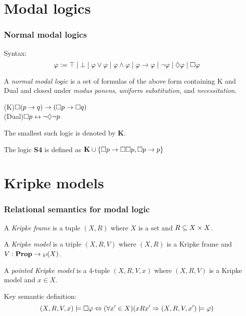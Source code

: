 \documentclass[
	11pt, %
	aspectratio=1610, %
]{beamer}
\begin{document}

\section{Modal logics}


\begin{frame}
	\frametitle{Normal modal logics}

		Syntax:
			\[ \varphi := \top
					\mid \bot
					\mid \varphi \lor \varphi
					\mid \varphi \land \varphi
					\mid \varphi \rightarrow \varphi
					\mid \neg \varphi
					\mid \Diamond \varphi
					\mid \Box \varphi \]

		\bigskip

		A \emph{normal modal logic} is a set of formulas of the above form containing K and Dual and closed under \emph{modus ponens}, \emph{uniform substitution}, and \emph{necessitation}.

		\bigskip

		(K)\hspace{1.08cm}$\Box (p \rightarrow q) \rightarrow (\Box p \rightarrow \Box q)$\\
		(Dual)\hspace{.5cm}$\Box p \leftrightarrow \neg \Diamond \neg p$

		\bigskip

		The smallest such logic is denoted by $\mathbf{K}$.

		\bigskip

		The logic \textbf{S4} is defined as $\mathbf{K} \cup \{\Box p \rightarrow \Box \Box p, \Box p \rightarrow p\}$

\end{frame}



\section{Kripke models}


\begin{frame}
	\frametitle{Relational semantics for modal logic}

	A \emph{Kripke frame} is a tuple $(X, R)$ where $X$ is a set and $R \subseteq X \times X$.

	\bigskip

	A \emph{Kripke model} is a triple $(X, R, V)$ where $(X, R)$ is a Kripke frame and $V: \mathbf{Prop} \to \wp(X)$.

	\bigskip

	A \emph{pointed Kripke model} is a 4-tuple $(X, R, V, x)$ where $(X, R, V)$ is a Kripke model and $x \in X$.

	\bigskip

	Key semantic definition:
		\[ (X, R, V, x) \models \Box \varphi \Leftrightarrow (\forall x' \in X)(xRx' \Rightarrow (X, R, V, x') \models \varphi) \]

\end{frame}
\end{document}
